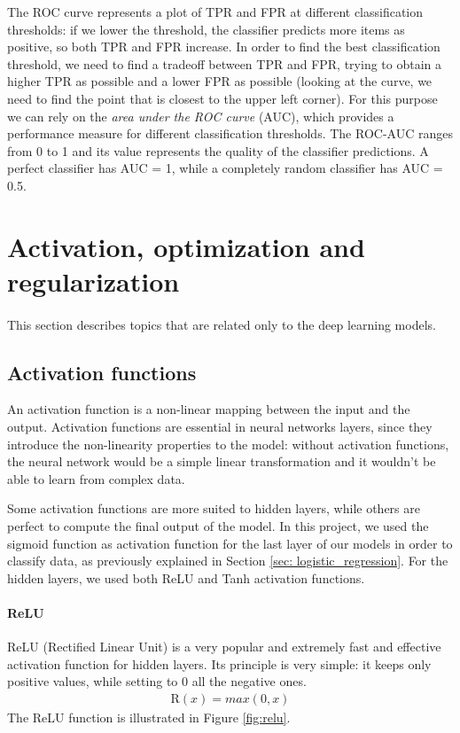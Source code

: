 The ROC curve represents a plot of TPR and FPR at different classification thresholds: if we lower the threshold, the classifier predicts more items as positive, so both TPR and FPR increase. In order to find the best classification threshold, we need to find a tradeoff between TPR and FPR, trying to obtain a higher TPR as possible and a lower FPR as possible (looking at the curve, we need to find the point that is closest to the upper left corner). For this purpose we can rely on the \textit{area under the ROC curve} (AUC), which provides a performance measure for different classification thresholds. The ROC-AUC ranges
from 0 to 1 and its value represents the quality of the classifier predictions. A perfect classifier has AUC = 1, while a completely random classifier has AUC = 0.5.

\section{Activation, optimization and regularization} \label{sec: activation_optimization_regularization}
\paragraph{} This section describes topics that are related only to the deep learning models.

\subsection{Activation functions}
An activation function is a non-linear mapping between the input and the output. Activation functions are essential in neural networks layers, since they introduce the non-linearity properties to the model: without activation functions, the neural network would be a simple linear transformation and it wouldn't be able to learn from complex data.

Some activation functions are more suited to hidden layers, while others are perfect to compute the final output of the model. In this project, we used the sigmoid function as activation function for the last layer of our models in order to classify data, as previously explained in Section \ref{sec: logistic_regression}. For the hidden layers, we used both ReLU and Tanh activation functions.

\paragraph{ReLU} ReLU (Rectified Linear Unit) is a very popular and extremely fast and effective activation function for hidden layers. Its principle is very simple: it keeps only positive values, while setting to 0 all the negative ones.
\begin{align}
    \text{R}(x) = max(0, x)
\end{align}
The ReLU function is illustrated in Figure \ref{fig:relu}.

